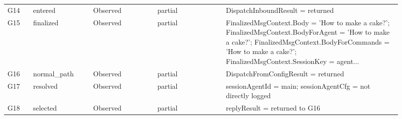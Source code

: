 \begin{longtable}{@{}p{0.06\linewidth}p{0.14\linewidth}p{0.15\linewidth}p{0.16\linewidth}p{0.41\linewidth}@{}}
G14 & entered & Observed & partial & DispatchInboundResult = returned \\
G15 & finalized & Observed & partial & FinalizedMsgContext.Body = 'How to make a cake?'; FinalizedMsgContext.BodyForAgent = 'How to make a cake?'; FinalizedMsgContext.BodyForCommands = 'How to make a cake?'; FinalizedMsgContext.SessionKey = agent... \\
G16 & normal\_path & Observed & partial & DispatchFromConfigResult = returned \\
G17 & resolved & Observed & partial & sessionAgentId = main; sessionAgentCfg = not directly logged \\
G18 & selected & Observed & partial & replyResult = returned to G16 \\
\bottomrule
\end{longtable}
